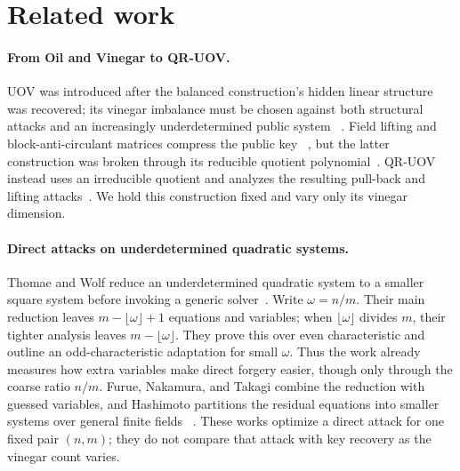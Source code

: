 \documentclass[11pt,a4paper]{article}
\theoremstyle{definition}
\theoremstyle{remark}
\newcommand{\QRUOV}{\textsf{QR-UOV}}
\begin{document}
\section{Related work}\label{sec:related}

\paragraph{From Oil and Vinegar to \QRUOV{}.}
UOV was introduced after the balanced construction's hidden linear structure
was recovered; its vinegar imbalance must be chosen against both structural
attacks and an increasingly underdetermined public system
~\cite{KPG1999,KipnisShamir1998,BraekenWolfPreneel2005}.  Field lifting and
block-anti-circulant matrices compress the public key
~\cite{FieldLifting,BACUOV}, but the latter construction was broken through
its reducible quotient polynomial~\cite{BACUOVAttack}.  \QRUOV{} instead uses
an irreducible quotient and analyzes the resulting pull-back and lifting
attacks~\cite{QRUOVOriginal}.  We hold this construction fixed and vary only
its vinegar dimension.

\paragraph{Direct attacks on underdetermined quadratic systems.}
Thomae and Wolf reduce an underdetermined quadratic system to a smaller square
system before invoking a generic solver~\cite{ThomaeWolf2012}.  Write
$\omega=n/m$.  Their main reduction leaves
$m-\lfloor\omega\rfloor+1$ equations and variables; when
$\lfloor\omega\rfloor$ divides $m$, their tighter analysis leaves
$m-\lfloor\omega\rfloor$.  They prove this over even characteristic and
outline an odd-characteristic adaptation for small $\omega$.  Thus the work
already measures how extra variables make direct forgery easier, though only
through the coarse ratio $n/m$.  Furue, Nakamura, and Takagi combine the
reduction with guessed variables, and Hashimoto partitions the residual
equations into smaller systems over general finite fields
~\cite{Hashimoto2023,FurueUnderdetermined2021}.  These works optimize a direct
attack for one fixed pair $(n,m)$; they do not compare that attack with key
recovery as the vinegar count varies.
\end{document}
